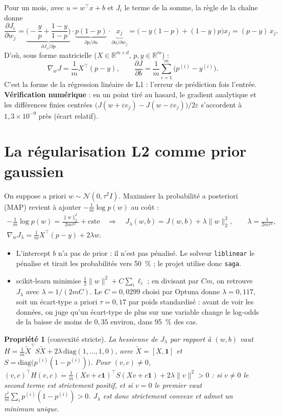 \documentclass[11pt,a4paper]{article}
\newtheorem*{prop}{Propriété}
\begin{document}
Pour un mois, avec $u=w^\top x+b$ et $J_i$ le terme de la somme, la règle de la chaîne donne
\[
\frac{\partial J_i}{\partial w_j}
=\underbrace{\Big(-\frac{y}{p}+\frac{1-y}{1-p}\Big)}_{\partial J_i/\partial p}
\cdot\underbrace{p(1-p)}_{\partial p/\partial u}\cdot\underbrace{x_j}_{\partial u/\partial w_j}
=\big(-y(1-p)+(1-y)p\big)x_j=(p-y)\,x_j .
\]
D'où, sous forme matricielle ($X\in\mathbb R^{m\times d}$, $p,y\in\mathbb R^m$) :
\[
\nabla_w J=\frac1m X^\top(p-y),\qquad \frac{\partial J}{\partial b}=\frac1m\sum_{i=1}^m\big(p^{(i)}-y^{(i)}\big).
\]
C'est la forme de la régression linéaire de L1 : l'erreur de prédiction fois l'entrée. \textbf{Vérification
numérique} : en un point tiré au hasard, le gradient analytique et les différences finies centrées
$\big(J(w+\varepsilon e_j)-J(w-\varepsilon e_j)\big)/2\varepsilon$ s'accordent à $1{,}3\times10^{-9}$ près (écart relatif).

\section{La régularisation L2 comme prior gaussien}

On suppose a priori $w\sim\mathcal N(0,\tau^2 I)$. Maximiser la probabilité a posteriori (MAP) revient à ajouter
$-\frac1m\log p(w)$ au coût :
\begin{gather*}
-\frac1m\log p(w)=\frac{\lVert w\rVert_2^2}{2m\tau^2}+\text{cste}
\quad\Longrightarrow\quad
J_\lambda(w,b)=J(w,b)+\lambda\lVert w\rVert_2^2,\qquad \lambda=\frac{1}{2m\tau^2},\\
\nabla_wJ_\lambda=\frac1mX^\top(p-y)+2\lambda w .
\end{gather*}
\begin{itemize}
\item L'intercept $b$ n'a pas de prior : il n'est pas pénalisé. Le solveur \texttt{liblinear} le pénalise et tirait les
probabilités vers 50~\% ; le projet utilise donc \texttt{saga}.
\item scikit-learn minimise $\tfrac12\lVert w\rVert^2+C\sum_i\ell_i$ ; en divisant par $Cm$, on retrouve $J_\lambda$ avec
$\lambda=1/(2mC)$. Le $C=0{,}0299$ choisi par Optuna donne $\lambda=0{,}117$, soit un écart-type a priori
$\tau=0{,}17$ par poids standardisé : avant de voir les données, on juge qu'un écart-type de plus sur une variable change
le log-odds de la baisse de moins de $0{,}35$ environ, dans 95~\% des cas.
\end{itemize}

\begin{prop}[convexité stricte]
La hessienne de $J_\lambda$ par rapport à $(w,b)$ vaut
$H=\frac1m\tilde X^\top S\tilde X+2\lambda\,\mathrm{diag}(1,\dots,1,0)$, avec $\tilde X=[X,\mathbf 1]$ et
$S=\mathrm{diag}\big(p^{(i)}(1-p^{(i)})\big)$. Pour $(v,c)\neq0$,
$(v,c)^\top H(v,c)=\frac1m(Xv+c\mathbf 1)^\top S(Xv+c\mathbf 1)+2\lambda\lVert v\rVert^2>0$ : si $v\neq0$ le second terme
est strictement positif, et si $v=0$ le premier vaut $\frac{c^2}m\sum_i p^{(i)}(1-p^{(i)})>0$. $J_\lambda$ est donc
strictement convexe et admet un minimum unique.
\end{prop}
\end{document}
